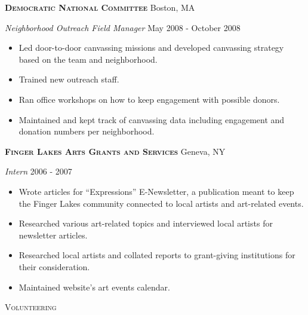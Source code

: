 \documentclass[a4paper]{article}
\newcommand{\lineunder} {
    \vspace*{-8pt} \\
    \hspace*{-18pt} \hrulefill \\
}
\newcommand{\header} [1] {
    {\hspace*{-18pt}\vspace*{6pt} \textsc{#1}}
    \vspace*{-6pt} \lineunder
    \vspace{2mm}
}
\begin{document}
\textbf{\textsc{Democratic National Committee}} \hfill Boston, MA\\
\vspace{2mm}

\begin{addmargin}[1em]{0em}

\textit{Neighborhood Outreach Field Manager} \hfill May 2008 - October 2008\\
\vspace{-1mm}
\begin{itemize} \itemsep 1pt
    \item Led door-to-door canvassing missions and developed canvassing strategy based on
        the team and neighborhood.
    \item Trained new outreach staff.
    \item Ran office workshops on how to keep engagement with possible
        donors.
    \item Maintained and kept track of canvassing data including engagement and donation
        numbers per neighborhood.
\end{itemize}

\end{addmargin}

\textbf{\textsc{Finger Lakes Arts Grants and Services}} \hfill Geneva, NY\\
\vspace{2mm}

\begin{addmargin}[1em]{0em}

\textit{Intern} \hfill 2006 - 2007\\
\vspace{-1mm}
\begin{itemize} \itemsep 1pt
    \item Wrote articles for “Expressions” E-Newsletter, a publication meant to keep the
        Finger Lakes community connected to local artists and art-related events.
    \item Researched various art-related topics and interviewed local artists for 
        newsletter articles.
    \item Researched local artists and collated reports to grant-giving institutions for
        their consideration.
    \item Maintained website's art events calendar. 
\end{itemize}
\end{addmargin}


\header{\faHeart \hspace{1pt} Volunteering}
\end{document}
